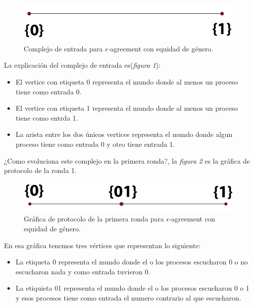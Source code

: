 \documentclass{article}
\begin{document}
\begin{enumerate}
{     \begin{figure}
       \centering
       \includegraphics[scale=0.25]{2_input.png}
       \caption{Complejo de entrada para $\epsilon$-agreement con equidad de género.}
     \end{figure}

     La explicación del complejo de entrada es(\textit{figura 1}):
     
     \begin{itemize}
       \item{El vertice con etiqueta {0} representa el mundo donde al menos un proceso
           tiene como entrada 0.}
       \item{El vertice con etiqueta {1} representa el mundo donde al menos un proceso
           tiene como entrda 1.}
       \item{La arista entre los dos únicos vertices representa el mundo donde algun 
           proceso tiene como entrada 0 y otro tiene entrada 1.}
     \end{itemize}
  }

  ¿Como evoluciona este complejo en la primera ronda?, la \textit{figura 2} es la
  gráfica de protocolo de la ronda 1.

  \begin{figure}
    \centering
    \includegraphics[scale=0.25]{2_protocol2.png}
    \caption{Gráfica de protocolo de la primera ronda  para $\epsilon$-agreement con equidad de género.}
  \end{figure}
  
  En esa gráfica tenemos tres vértices que representan lo siguiente:
  
  \begin{itemize}
    
    \item{La etiqueta {0} representa el mundo donde el o los procesos  escucharon 0 
         o no escucharon nada y como entrada tuvieron 0.}
      
    \item{La etiquieta {01} representa el mundo donde el o los procesos  escucharon 0 o 1
        y esos procesos tiene como entrada el numero contrario al que escucharon.}
      

\end{itemize}
\end{enumerate}
\end{document}
